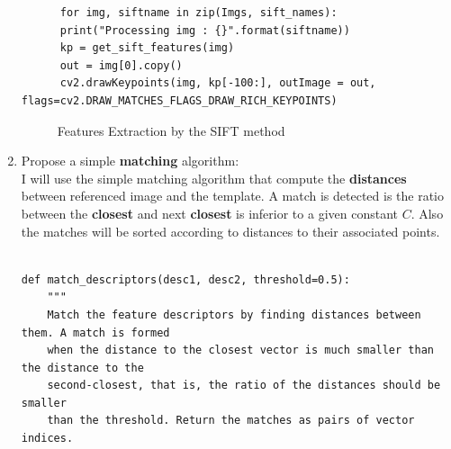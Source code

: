 \documentclass[12pt]{article}
\begin{document}
\begin{enumerate}[label=(\alph*)]
\begin{verbatim}
      for img, siftname in zip(Imgs, sift_names):
      print("Processing img : {}".format(siftname))
      kp = get_sift_features(img)
      out = img[0].copy()
      cv2.drawKeypoints(img, kp[-100:], outImage = out, flags=cv2.DRAW_MATCHES_FLAGS_DRAW_RICH_KEYPOINTS)
      \end{verbatim}
    \begin{figure}[ht]
        \centering
\hfill
\hfill
        \caption{Features Extraction by the SIFT method}
      \end{figure}

    \item Propose a simple \textbf{matching} algorithm:\\

 I will use the simple matching algorithm that compute the \textbf{distances}
 between referenced image and the template. A match is detected is the ratio
 between the \textbf{closest} and next \textbf{closest} is inferior to a given
 constant $C$. Also the matches will be sorted according to distances to their
 associated points.
 \begin{verbatim}

def match_descriptors(desc1, desc2, threshold=0.5):
    """
    Match the feature descriptors by finding distances between them. A match is formed 
    when the distance to the closest vector is much smaller than the distance to the 
    second-closest, that is, the ratio of the distances should be smaller
    than the threshold. Return the matches as pairs of vector indices.
    

\end{verbatim}
\end{enumerate}
\end{document}

